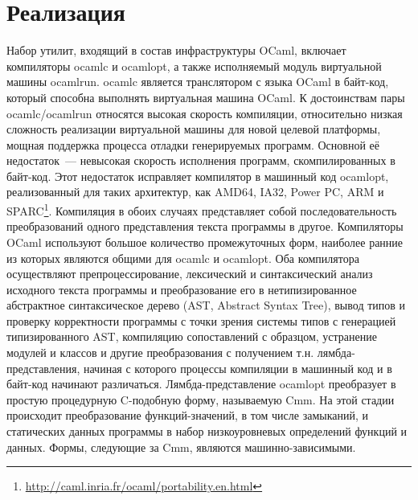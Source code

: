 \documentclass[a4paper, 12pt]{article}
\begin{document}
\section{Реализация}
Набор утилит, входящий в состав инфраструктуры OCaml, включает компиляторы ocamlc и ocamlopt, а также исполняемый модуль
виртуальной машины ocamlrun. ocamlc является транслятором с языка OCaml в байт-код, который способна выполнять
виртуальная машина OCaml. К достоинствам пары ocamlc/ocamlrun относятся высокая скорость компиляции, относительно
низкая сложность реализации виртуальной машины для новой целевой платформы, мощная поддержка процесса отладки
генерируемых программ. Основной её недостаток~--- невысокая скорость исполнения программ, скомпилированных в байт-код.
Этот недостаток исправляет компилятор в машинный код ocamlopt, реализованный для таких архитектур, как AMD64, IA32,
Power PC, ARM и SPARC\footnote{\url{http://caml.inria.fr/ocaml/portability.en.html}}. Компиляция в обоих случаях
представляет
собой последовательность преобразований одного представления текста программы в другое. Компиляторы OCaml используют
большое количество промежуточных форм, наиболее ранние из которых являются общими для ocamlc и ocamlopt. Оба компилятора
осуществляют препроцессирование, лексический и синтаксический анализ исходного текста программы и преобразование его в
нетипизированное абстрактное синтаксическое дерево (AST, Abstract Syntax Tree), вывод типов и проверку корректности
программы с точки зрения системы типов с генерацией типизированного AST, компиляцию сопоставлений с образцом, устранение
модулей и классов и другие преобразования с получением т.н. лямбда-представления, начиная с которого процессы компиляции
в машинный код и в байт-код начинают различаться. Лямбда-представление ocamlopt преобразует в простую процедурную
C-подобную форму, называемую Cmm. На этой стадии происходит преобразование функций-значений, в том числе замыканий, и
статических данных программы в набор низкоуровневых определений функций и данных. Формы, следующие за Cmm, являются
машинно-зависимыми.
\end{document}
